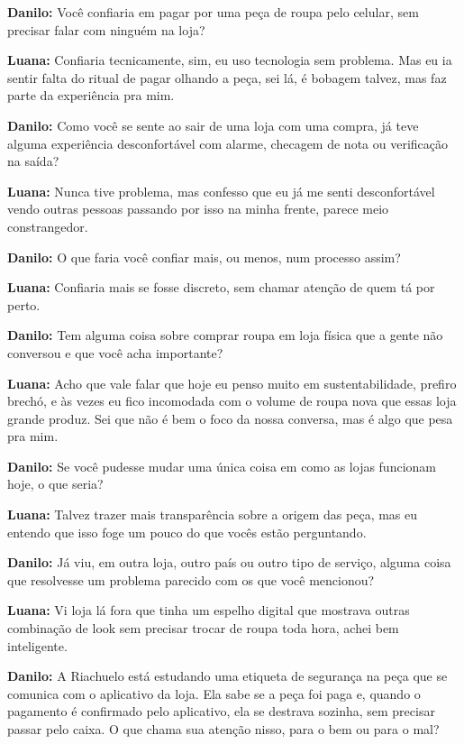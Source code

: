 \textbf{Danilo:} Você confiaria em pagar por uma peça de roupa pelo celular, sem precisar falar com ninguém na loja?

\textbf{Luana:} Confiaria tecnicamente, sim, eu uso tecnologia sem problema. Mas eu ia sentir falta do ritual de pagar olhando a peça, sei lá, é bobagem talvez, mas faz parte da experiência pra mim.

\textbf{Danilo:} Como você se sente ao sair de uma loja com uma compra, já teve alguma experiência desconfortável com alarme, checagem de nota ou verificação na saída?

\textbf{Luana:} Nunca tive problema, mas confesso que eu já me senti desconfortável vendo outras pessoas passando por isso na minha frente, parece meio constrangedor.

\textbf{Danilo:} O que faria você confiar mais, ou menos, num processo assim?

\textbf{Luana:} Confiaria mais se fosse discreto, sem chamar atenção de quem tá por perto.

\textbf{Danilo:} Tem alguma coisa sobre comprar roupa em loja física que a gente não conversou e que você acha importante?

\textbf{Luana:} Acho que vale falar que hoje eu penso muito em sustentabilidade, prefiro brechó, e às vezes eu fico incomodada com o volume de roupa nova que essas loja grande produz. Sei que não é bem o foco da nossa conversa, mas é algo que pesa pra mim.

\textbf{Danilo:} Se você pudesse mudar uma única coisa em como as lojas funcionam hoje, o que seria?

\textbf{Luana:} Talvez trazer mais transparência sobre a origem das peça, mas eu entendo que isso foge um pouco do que vocês estão perguntando.

\textbf{Danilo:} Já viu, em outra loja, outro país ou outro tipo de serviço, alguma coisa que resolvesse um problema parecido com os que você mencionou?

\textbf{Luana:} Vi loja lá fora que tinha um espelho digital que mostrava outras combinação de look sem precisar trocar de roupa toda hora, achei bem inteligente.

\textbf{Danilo:} A Riachuelo está estudando uma etiqueta de segurança na peça que se comunica com o aplicativo da loja. Ela sabe se a peça foi paga e, quando o pagamento é confirmado pelo aplicativo, ela se destrava sozinha, sem precisar passar pelo caixa. O que chama sua atenção nisso, para o bem ou para o mal?

